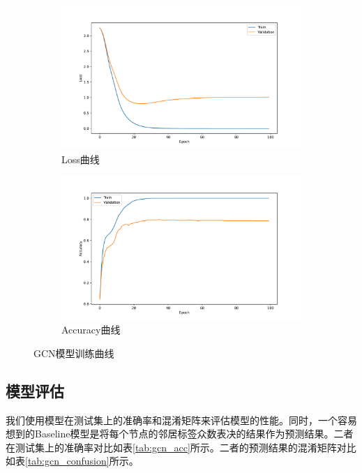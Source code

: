 \begin{figure}[htbp]
    \centering
    \begin{subfigure}{0.48\textwidth}
        \centering
        \includegraphics[width=\textwidth]{loss.pdf}
        \caption{Loss曲线}
    \end{subfigure}
    \begin{subfigure}{0.48\textwidth}
        \centering
        \includegraphics[width=\textwidth]{acc.pdf}
        \caption{Accuracy曲线}
    \end{subfigure}
    \caption{GCN模型训练曲线}
    \label{fig:gcn_train}
\end{figure}

\subsection{模型评估}
我们使用模型在测试集上的准确率和混淆矩阵来评估模型的性能。同时，一个容易想到的Baseline模型是将每个节点的邻居标签众数表决的结果作为预测结果。二者在测试集上的准确率对比如表\ref{tab:gcn_acc}所示。二者的预测结果的混淆矩阵对比如表\ref{tab:gcn_confusion}所示。

